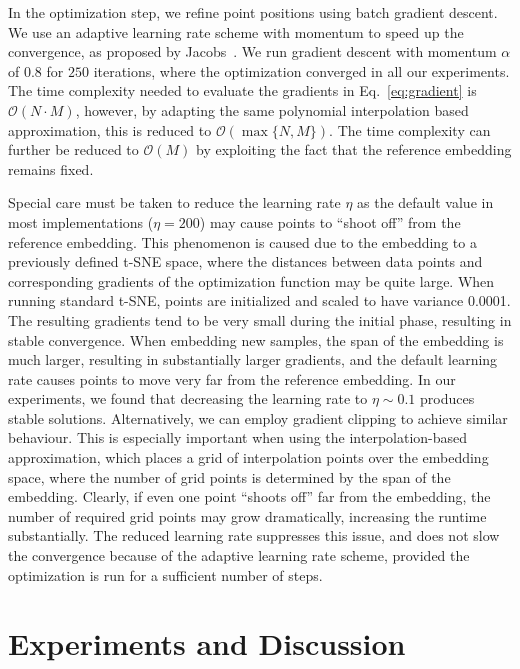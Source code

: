 \documentclass[runningheads]{llncs}
\begin{document}
In the optimization step, we refine point positions using batch gradient
descent. We use an adaptive learning rate scheme with momentum to speed up the
convergence, as proposed by Jacobs~\cite{Jacobs1988,Maaten2014}. We run gradient
descent with momentum $\alpha$ of $0.8$ for $250$ iterations, where the
optimization converged in all our experiments. The time complexity needed to
evaluate the gradients in Eq.~\ref{eq:gradient} is $\mathcal{O}(N \cdot M)$,
however, by adapting the same polynomial interpolation based approximation, this
is reduced to $\mathcal{O}(\max \{ N, M \})$. The time complexity can further be
reduced to $\mathcal{O}(M)$ by exploiting the fact that the reference embedding
remains fixed.

Special care must be taken to reduce the learning rate $\eta$ as the default
value in most implementations ($\eta = 200$) may cause points to ``shoot off''
from the reference embedding. This phenomenon is caused due to the embedding to
a previously defined t-SNE space, where the distances between data points and
corresponding gradients of the optimization function may be quite large. When
running standard t-SNE, points are initialized and scaled to have variance
0.0001. The resulting gradients tend to be very small during the initial phase,
resulting in stable convergence. When embedding new samples, the span of the
embedding is much larger, resulting in substantially larger gradients, and the
default learning rate causes points to move very far from the reference
embedding. In our experiments, we found that decreasing the learning rate to
$\eta \sim 0.1$ produces stable solutions. Alternatively, we can employ gradient
clipping to achieve similar behaviour. This is especially important when using
the interpolation-based approximation, which places a grid of interpolation
points over the embedding space, where the number of grid points is determined
by the span of the embedding. Clearly, if even one point ``shoots off'' far from
the embedding, the number of required grid points may grow dramatically,
increasing the runtime substantially. The reduced learning rate suppresses this
issue, and does not slow the convergence because of the adaptive learning rate
scheme, provided the optimization is run for a sufficient number of steps.

\section{Experiments and Discussion}
\end{document}
